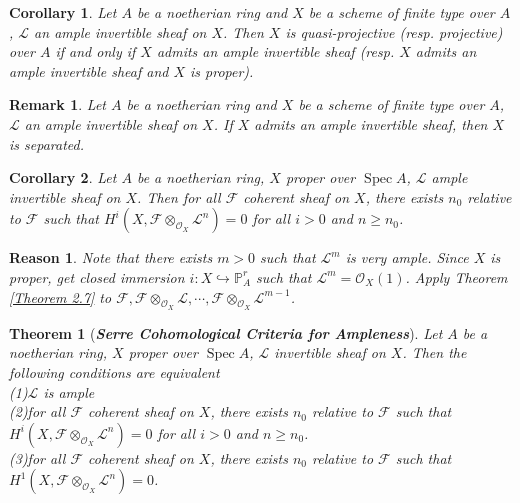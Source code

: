 \documentclass{ctexart}
\newtheorem{remark}{Remark}[section]
\newtheorem{theorem}{Theorem}[section]
\newtheorem{reason}{Reason}[section]
\newtheorem{corollary}{Corollary}[section]
\newcommand{\spec}{\operatorname{Spec}}
\begin{document}
\begin{corollary}
    Let $A$ be a noetherian ring and $X$ be a scheme of finite type over $A$, $\mathcal{L}$ an ample invertible sheaf on $X$.
    Then $X$ is quasi-projective (resp. projective) over $A$ if and only if $X$ admits an ample invertible sheaf (resp. $X$ admits an ample invertible sheaf and $X$ is proper).
    \label{Corollary 4.1}
\end{corollary}
\begin{remark}
    Let $A$ be a noetherian ring and $X$ be a scheme of finite type over $A$, $\mathcal{L}$ an ample invertible sheaf on $X$.
    If $X$ admits an ample invertible sheaf, then $X$ is separated. 
\end{remark}
\begin{corollary}
    Let $A$ be a noetherian ring, $X$ proper over $\spec A$, $\mathcal{L}$ ample invertible sheaf on $X$.
    Then for all $\mathcal{F}$ coherent sheaf on $X$, there exists $n_{0}$ relative to $\mathcal{F}$ such that $H^{i}(X, \mathcal{F} \otimes_{\mathcal{O}_{X}} \mathcal{L}^{n}) = 0$ for all $i > 0$ and $n \ge n_{0}$. 
    \label{Corollary 4.2}
\end{corollary}
\begin{reason}
    Note that there exists $m > 0$ such that $\mathcal{L}^{m}$ is very ample.
    Since $X$ is proper, get closed immersion $i: X \hookrightarrow \mathbb{P}_{A}^{r}$ such that $\mathcal{L}^{m} = \mathcal{O}_{X}(1)$.
    Apply Theorem \ref{Theorem 2.7} to $\mathcal{F}, \mathcal{F} \otimes_{\mathcal{O}_{X}} \mathcal{L}, \cdots, \mathcal{F} \otimes_{\mathcal{O}_{X}} \mathcal{L}^{m - 1}$.
\end{reason}
\begin{theorem}[\textbf{\emph{Serre Cohomological Criteria for Ampleness}}]
    Let $A$ be a noetherian ring, $X$ proper over $\spec A$, $\mathcal{L}$ invertible sheaf on $X$.
    Then the following conditions are equivalent \\
    (1)$\mathcal{L}$ is ample \\
    (2)for all $\mathcal{F}$ coherent sheaf on $X$, 
    there exists $n_{0}$ relative to $\mathcal{F}$ such that $H^{i}(X, \mathcal{F} \otimes_{\mathcal{O}_{X}} \mathcal{L}^{n}) = 0$ for all $i > 0$ and $n \ge n_{0}$. \\
    (3)for all $\mathcal{F}$ coherent sheaf on $X$, 
    there exists $n_{0}$ relative to $\mathcal{F}$ such that $H^{1}(X, \mathcal{F} \otimes_{\mathcal{O}_{X}} \mathcal{L}^{n}) = 0$.
    \vspace{-\baselineskip} %
    \label{Theorem 4.2}
\end{theorem}
\end{document}

